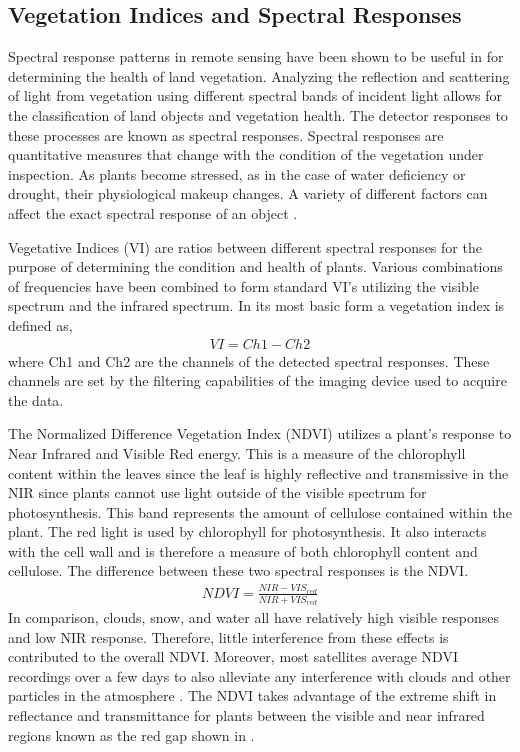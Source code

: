 \subsection{Vegetation Indices and Spectral Responses}
Spectral response patterns in remote sensing have been shown to be useful in \cite{mississippi}\cite{schott}\cite{harris} for determining the health of land vegetation.  Analyzing the reflection and scattering of light from vegetation using different spectral bands of incident light allows for the classification of land objects and vegetation health.  The detector responses to these processes are known as spectral responses.  Spectral responses are quantitative measures that change with the condition of the vegetation under inspection.  As plants become stressed, as in the case of water deficiency or drought, their physiological makeup changes.  A variety of different factors can affect the exact spectral response of an object \cite{remotesensing}.

Vegetative Indices (VI) are ratios between different spectral responses for the purpose of determining the condition and health of plants.  Various combinations of frequencies have been combined to form standard VI’s utilizing the visible spectrum and the infrared spectrum. In its most basic form a vegetation index is defined as,
%
\begin{align}
    VI = Ch1 - Ch2
\end{align}
%
where Ch1 and Ch2 are the channels of the detected spectral responses.  These channels are set by the filtering capabilities of the imaging device used to acquire the data.

The Normalized Difference Vegetation Index (NDVI) utilizes a plant's response to Near Infrared and Visible Red energy.  This is a measure of the chlorophyll content within the leaves since the leaf is highly reflective and transmissive in the NIR since plants cannot use light outside of the visible spectrum for photosynthesis.  This band represents the amount of cellulose contained within the plant.  The red light is used by chlorophyll for photosynthesis.  It also interacts with the cell wall and is therefore a measure of both chlorophyll content and cellulose.  The difference between these two spectral responses is the NDVI.
%
\begin{align}
    NDVI = \frac{NIR - VIS_{red}}{NIR + VIS_{red}}
\end{align}
%
In comparison, clouds, snow, and water all have relatively high visible responses and low NIR response.  Therefore, little interference from these effects is contributed to the overall NDVI.  Moreover, most satellites average NDVI recordings over a few days to also alleviate any interference with clouds and other particles in the atmosphere \cite{remotesensing}.
The NDVI takes advantage of the extreme shift in reflectance and transmittance for plants between the visible and near infrared regions known as the red gap shown in \cite{vanderbilt}.

